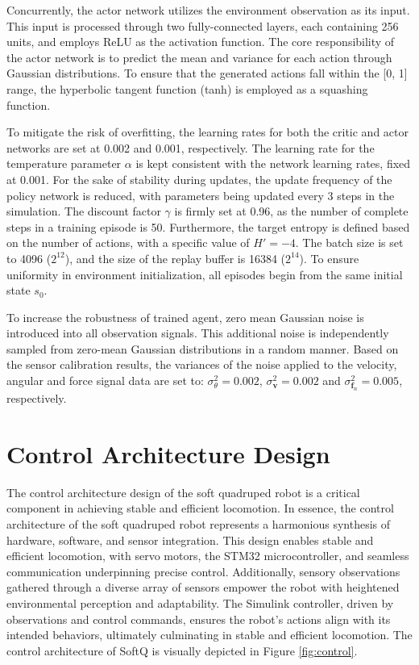 Concurrently, the actor network utilizes the environment observation as its input. This input is processed through two fully-connected layers, each containing 256 units, and employs ReLU as the activation function. The core responsibility of the actor network is to predict the mean and variance for each action through Gaussian distributions. To ensure that the generated actions fall within the [0, 1] range, the hyperbolic tangent function (tanh) is employed as a squashing function. 

To mitigate the risk of overfitting, the learning rates for both the critic and actor networks are set at 0.002 and 0.001, respectively. The learning rate for the temperature parameter $\alpha$ is kept consistent with the network learning rates, fixed at 0.001. For the sake of stability during updates, the update frequency of the policy network is reduced, with parameters being updated every 3 steps in the simulation. The discount factor $\gamma$ is firmly set at 0.96, as the number of complete steps in a training episode is 50. Furthermore, the target entropy is defined based on the number of actions, with a specific value of $H'=-4$. The batch size is set to 4096 ($2^{12}$), and the size of the replay buffer is 16384 ($2^{14}$). To ensure uniformity in environment initialization, all episodes begin from the same initial state $s_0$.

To increase the robustness of trained agent, zero mean Gaussian noise is introduced into all observation signals. This additional noise is independently sampled from zero-mean Gaussian distributions in a random manner. Based on the sensor calibration results, the variances of the noise applied to the velocity, angular and force signal data are set to: $\sigma_\theta^2 = 0.002$, $\sigma_{\mathbf{v}}^2 = 0.002$ and $\sigma_{\mathbf{f}_n}^2 = 0.005$, respectively.

\section{Control Architecture Design}
The control architecture design of the soft quadruped robot is a critical component in achieving stable and efficient locomotion. In essence, the control architecture of the soft quadruped robot represents a harmonious synthesis of hardware, software, and sensor integration. This design enables stable and efficient locomotion, with servo motors, the STM32 microcontroller, and seamless communication underpinning precise control. Additionally, sensory observations gathered through a diverse array of sensors empower the robot with heightened environmental perception and adaptability. The Simulink controller, driven by observations and control commands, ensures the robot's actions align with its intended behaviors, ultimately culminating in stable and efficient locomotion. The control architecture of SoftQ is visually depicted in Figure \ref{fig:control}.


